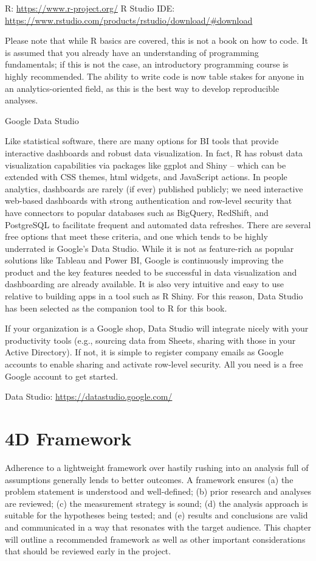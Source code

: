 \documentclass[]{book}
\begin{document}
R: \url{https://www.r-project.org/}
R Studio IDE: \url{https://www.rstudio.com/products/rstudio/download/\#download}

Please note that while R basics are covered, this is not a book on how to code. It is assumed that you already have an understanding of programming fundamentals; if this is not the case, an introductory programming course is highly recommended. The ability to write code is now table stakes for anyone in an analytics-oriented field, as this is the best way to develop reproducible analyses.

 Google Data Studio

Like statistical software, there are many options for BI tools that provide interactive dashboards and robust data visualization. In fact, R has robust data visualization capabilities via packages like ggplot and Shiny -- which can be extended with CSS themes, html widgets, and JavaScript actions. In people analytics, dashboards are rarely (if ever) published publicly; we need interactive web-based dashboards with strong authentication and row-level security that have connectors to popular databases such as BigQuery, RedShift, and PostgreSQL to facilitate frequent and automated data refreshes. There are several free options that meet these criteria, and one which tends to be highly underrated is Google's Data Studio. While it is not as feature-rich as popular solutions like Tableau and Power BI, Google is continuously improving the product and the key features needed to be successful in data visualization and dashboarding are already available. It is also very intuitive and easy to use relative to building apps in a tool such as R Shiny. For this reason, Data Studio has been selected as the companion tool to R for this book.

If your organization is a Google shop, Data Studio will integrate nicely with your productivity tools (e.g., sourcing data from Sheets, sharing with those in your Active Directory). If not, it is simple to register company emails as Google accounts to enable sharing and activate row-level security. All you need is a free Google account to get started.

Data Studio: \url{https://datastudio.google.com/}

\hypertarget{d-framework}{%
\section{4D Framework}\label{d-framework}}

Adherence to a lightweight framework over hastily rushing into an analysis full of assumptions generally lends to better outcomes. A framework ensures (a) the problem statement is understood and well-defined; (b) prior research and analyses are reviewed; (c) the measurement strategy is sound; (d) the analysis approach is suitable for the hypotheses being tested; and (e) results and conclusions are valid and communicated in a way that resonates with the target audience. This chapter will outline a recommended framework as well as other important considerations that should be reviewed early in the project.
\end{document}
